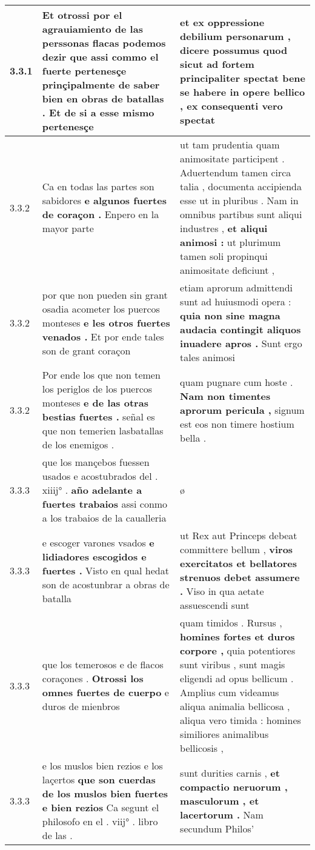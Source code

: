\begin{tabular}{|p{1cm}|p{6.5cm}|p{6.5cm}|}
3.3.1 & Et otrossi por el agrauiamiento de las perssonas flacas podemos dezir \textbf{ que assi commo el fuerte pertenesçe prinçipalmente de saber bien en obras de batallas . } Et de si a esse mismo pertenesçe & et ex oppressione debilium personarum , dicere possumus quod sicut ad fortem \textbf{ principaliter spectat bene se habere in opere bellico , } ex consequenti vero spectat \\\hline
3.3.2 & Ca en todas las partes son sabidores \textbf{ e algunos fuertes de coraçon . } Enpero en la mayor parte & ut tam prudentia quam animositate participent . Aduertendum tamen circa talia , documenta accipienda esse ut in pluribus . Nam in omnibus partibus sunt aliqui industres , \textbf{ et aliqui animosi : } ut plurimum tamen soli propinqui animositate deficiunt , \\\hline
3.3.2 & por que non pueden sin grant osadia acometer los puercos monteses \textbf{ e les otros fuertes venados . } Et por ende tales son de grant coraçon & etiam aprorum admittendi sunt ad huiusmodi opera : \textbf{ quia non sine magna audacia contingit aliquos inuadere apros . } Sunt ergo tales animosi \\\hline
3.3.2 & Por ende los que non temen los periglos de los puercos monteses \textbf{ e de las otras bestias fuertes . } señal es que non temerien lasbatallas de los enemigos . & quam pugnare cum hoste . \textbf{ Nam non timentes aprorum pericula , } signum est eos non timere hostium bella . \\\hline
3.3.3 & que los mançebos fuessen usados e acostubrados del . xiiij° . \textbf{ año adelante a fuertes trabaios } assi conmo a los trabaios de la caualleria & ø \\\hline
3.3.3 & e escoger varones vsados \textbf{ e lidiadores escogidos e fuertes . } Visto en qual hedat son de acostunbrar a obras de batalla & ut Rex aut Princeps debeat committere bellum , \textbf{ viros exercitatos et bellatores strenuos debet assumere . } Viso in qua aetate assuescendi sunt \\\hline
3.3.3 & que los temerosos e de flacos coraçones . \textbf{ Otrossi los omnes fuertes de cuerpo } e duros de mienbros & quam timidos . Rursus , \textbf{ homines fortes et duros corpore , } quia potentiores sunt viribus , sunt magis eligendi ad opus bellicum . Amplius cum videamus aliqua animalia bellicosa , aliqua vero timida : homines similiores animalibus bellicosis , \\\hline
3.3.3 & e los muslos bien rezios e los laçertos \textbf{ que son cuerdas de los muslos bien fuertes e bien rezios } Ca segunt el philosofo en el . viij° . libro de las . & sunt durities carnis , \textbf{ et compactio neruorum , masculorum , et lacertorum . } Nam secundum Philos’ \\\hline

\end{tabular}
